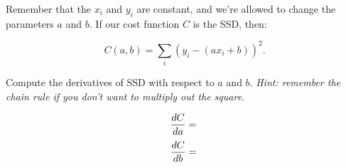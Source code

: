 \documentclass[11pt]{article}
\begin{document}
Remember that the $x_i$ and $y_i$ are constant, and we're allowed to
change the parameters $a$ and $b$. If our cost function $C$ is the SSD,
then:

\begin{equation}
    C(a,b) = \sum_i (y_i - (ax_i + b))^2.
\end{equation}

Compute the derivatives of SSD with respect to $a$ and $b$.
\emph{ Hint: remember the chain rule if you don't want to multiply out
the square.}


\begin{equation}
        \frac{ dC }{ da } =  \\
\end{equation}
\begin{equation}
        \frac{ dC }{ db } =  \\
\end{equation}

\end{document}
